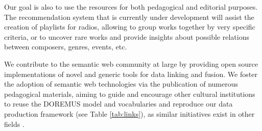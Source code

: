 Our goal is also to use the resources for both pedagogical and editorial purposes. The recommendation system that is currently under development will assist the creation of playlists for radios, allowing to group works together by very specific criteria, or to uncover rare works and provide insights about possible relations between composers, genres, events, etc.

We contribute to the semantic web community at large by providing open source implementations of novel and generic tools for data linking and fusion. We foster the adoption of semantic web technologies via the publication of numerous pedagogical materials, aiming to guide and encourage other cultural institutions to reuse the DOREMUS model and vocabularies and reproduce our data production framework (see Table \ref{tab:links}), as similar initiatives exist in other fields \cite{villazon2011methodological}.